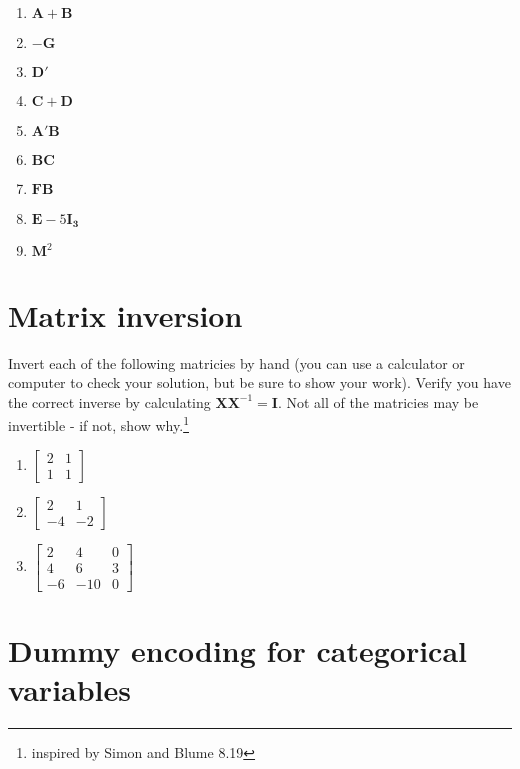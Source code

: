\documentclass[
]{article}
\begin{document}
\begin{enumerate}
\def\labelenumi{\alph{enumi}.}
\item
  \(\mathbf{A} + \mathbf{B}\)
\item
  \(-\mathbf{G}\)
\item
  \(\mathbf{D}'\)
\item
  \(\mathbf{C} + \mathbf{D}\)
\item
  \(\mathbf{A}' \mathbf{B}\)
\item
  \(\mathbf{BC}\)
\item
  \(\mathbf{FB}\)
\item
  \(\mathbf{E} - 5\mathbf{I_3}\)
\item
  \(\mathbf{M}^2\)
\end{enumerate}

\section{Matrix inversion}\label{matrix-inversion}

Invert each of the following matricies by hand (you can use a calculator
or computer to check your solution, but be sure to show your work).
Verify you have the correct inverse by calculating
\(\mathbf{XX}^{-1} = \mathbf{I}\). Not all of the matricies may be
invertible - if not, show why.\footnote{inspired by Simon and Blume 8.19}

\begin{enumerate}
\def\labelenumi{\alph{enumi}.}
\item
  \(\left[ \begin{array}{rr} 2 & 1 \\ 1 & 1 \end{array}\right]\)
\item
  \(\left[ \begin{array}{rr} 2 & 1 \\ -4 & -2 \end{array}\right]\)
\item
  \(\left[ \begin{array}{rrr} 2 & 4 & 0 \\ 4 & 6 & 3 \\ -6 & -10 & 0 \end{array}\right]\)
\end{enumerate}

\section{Dummy encoding for categorical
variables}\label{dummy-encoding-for-categorical-variables}
\end{document}

